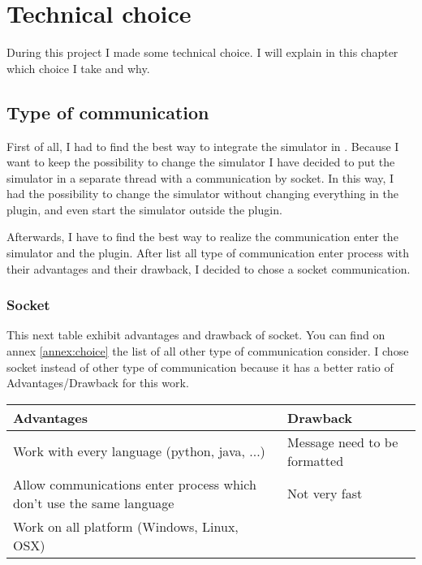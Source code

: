 
\chapter{Technical choice }
\label{chap:choice}
During this project I made some technical choice. I will explain in this chapter which choice I take and why.

\section{Type of communication}

First of all, I had to find the best way to integrate the simulator in \umld. Because I want to keep the possibility to change the simulator I have decided to put the simulator in a separate thread with a communication by socket. In this way, I had the possibility to change the simulator without changing everything in the plugin, and even start the simulator outside the plugin.

Afterwards, I have to find the best way to realize the communication enter the simulator and the plugin. After list all type of communication enter process with their advantages and their drawback, I decided to chose a socket communication.%




\subsection{Socket}

This next table exhibit advantages and drawback of socket. You can find on annex \ref{annex:choice} the list of all other type of communication consider. I chose socket instead of other type of communication because it has a better ratio of Advantages/Drawback for this work.
~\\

\begin{tabular}{|p{}||p{}|}
  \hline
  \textbf{Advantages}&\textbf{Drawback}\\
  \hline
  Work with every language (python, java, ...) & Message need to be formatted\\
  \hline
  Allow communications enter process which don't use the same language& Not very fast\\
  \hline
  Work on all platform (Windows, Linux, OSX)&\\
  \hline
\end{tabular}


